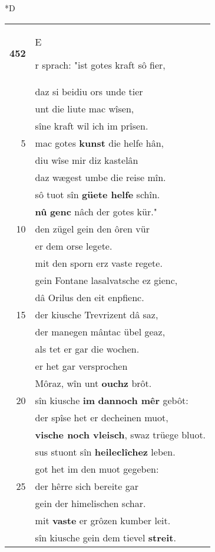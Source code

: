 \documentclass[8pt,a4paper,notitlepage]{article}
\begin{document}
\begin{table}[ht]
\begin{minipage}[t]{0.5\linewidth}
\small
\begin{center}*D
\end{center}
\begin{tabular}{rl}
\textbf{452} & \begin{large}E\end{large}r sprach: "ist gotes kraft sô fier,\\ 
 & daz si beidiu ors unde tier\\ 
 & unt die liute mac wîsen,\\ 
 & sîne kraft wil ich im prîsen.\\ 
5 & mac gotes \textbf{kunst} die helfe hân,\\ 
 & diu wîse mir diz kastelân\\ 
 & daz wægest umbe die reise mîn.\\ 
 & sô tuot sîn \textbf{güete helfe} schîn.\\ 
 & \textbf{nû} \textbf{genc} nâch der gotes kür."\\ 
10 & den zügel gein den ôren vür\\ 
 & er dem orse legete.\\ 
 & mit den sporn erz vaste regete.\\ 
 & gein Fontane lasalvatsche ez gienc,\\ 
 & dâ Orilus den eit enpfienc.\\ 
15 & der kiusche Trevrizent dâ saz,\\ 
 & der manegen mântac übel geaz,\\ 
 & als tet er gar die wochen.\\ 
 & er het gar versprochen\\ 
 & Môraz, wîn unt \textbf{ouchz} brôt.\\ 
20 & sîn kiusche \textbf{im} \textbf{dannoch mêr} gebôt:\\ 
 & der spîse het er decheinen muot,\\ 
 & \textbf{vische noch vleisch}, swaz trüege bluot.\\ 
 & sus stuont sîn \textbf{heileclîchez} leben.\\ 
 & got het im den muot gegeben:\\ 
25 & der hêrre sich bereite gar\\ 
 & gein der himelischen schar.\\ 
 & mit \textbf{vaste} er grôzen kumber leit.\\ 
 & sîn kiusche gein dem tievel \textbf{streit}.\\ 

\end{tabular}
\end{minipage}
\end{table}
\end{document}
